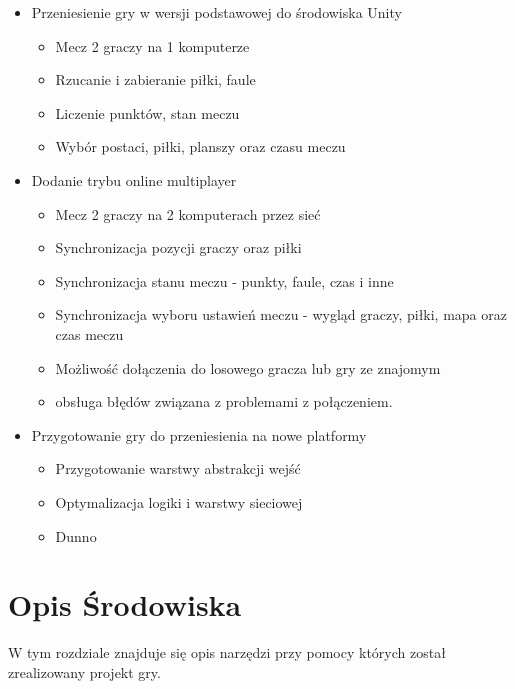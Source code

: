 \documentclass[a4paper,12pt,twoside,openany]{report}
\begin{document}
\begin{itemize}
    \item Przeniesienie gry w wersji podstawowej do środowiska Unity
    \begin{itemize}
        \item Mecz 2 graczy na 1 komputerze
        \item Rzucanie i zabieranie piłki, faule
        \item Liczenie punktów, stan meczu
        \item Wybór postaci, piłki, planszy oraz czasu meczu
    \end{itemize}
    
    \item Dodanie trybu online multiplayer
    \begin{itemize}
        \item Mecz 2 graczy na 2 komputerach przez sieć
        \item Synchronizacja pozycji graczy oraz piłki
        \item Synchronizacja stanu meczu - punkty, faule, czas i inne
        \item Synchronizacja wyboru ustawień meczu - wygląd graczy, piłki, mapa oraz czas meczu
        \item Możliwość dołączenia do losowego gracza lub gry ze znajomym
        \item obsługa błędów związana z problemami z połączeniem.
    \end{itemize}
    
    \item Przygotowanie gry do przeniesienia na nowe platformy
    \begin{itemize}
        \item Przygotowanie warstwy abstrakcji wejść
        \item Optymalizacja logiki i warstwy sieciowej
        \item Dunno
    \end{itemize}
\end{itemize}



\chapter{Opis Środowiska}
W tym rozdziale znajduje się opis narzędzi przy pomocy których został zrealizowany projekt gry.
\end{document}
